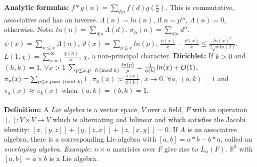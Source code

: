 {\bf Analytic formulas:} $f*g(n)= \sum_{d|n} f(d)g({\frac n d})$.  
This is commutative, associative and has an inverse.
$\Lambda(n)= ln(n)$, if $n= p^m$,
$\Lambda(n)= 0$, otherwise.  Note: $ln(n)= \sum_{d|n} \Lambda(d)$.
$\sigma_{\alpha}(n)= \sum_{d|n} d^{\alpha}$.
$\psi(x)= \sum_{n \leq x} \Lambda(n)$,
$\vartheta(x)= \sum_{p \leq x} ln(p)$.
${\frac {\psi(x)} {x}} -
{\frac {\vartheta(x)} {x}} \leq {\frac {ln(x)^2} {2 {\sqrt x} ln(2)}}$.
$L(1,\chi)= \sum_{n=1}^{\infty} {\frac {\chi(n)} n}$, $\chi$, a
non-principal character.
{\bf Dirichlet:}  If $k>0$ and $(h,k)=1$, $\forall x>1$
$\sum_{p \leq x, p=h \thinspace \textnormal{(mod } k \textnormal{)}} {\frac {ln(p)} p}=
{\frac 1 {\phi(k)}} ln(x) + O(1)$.
$\pi_a (x)= \sum_{p \leq x, p=a \; \thinspace \textnormal{(mod } k \textnormal{)}} 1$.
$\pi_a (x) \approx {\frac {\pi(x)} {\phi(k)}}$, $x \rightarrow 0$,
$\forall a$, $(a, k)=1$ and $\pi_a (x) \approx \pi_b (x)$ when
$(a,k)=(b,k)=1$.
\\
\\
{\bf Definition:} A \emph{Lie algebra} is a vector space, $V$ over a field, $F$ with an operation
$[,]: V \times V \rightarrow V$ which is alternating and bilinear and which satisfies the Jacobi
identity: $[x,[y,z]] + [y,[z,x]] + [z, [x,y]]= 0$.  If $A$ is an associative algebra, there is
a corresponding Lie algebra with $[a,b]= a*b-b*a$, called an \emph{enveloping algebra}.
\emph{Example:} $n \times n$ matricies over $F$ give rise to $L_n(F)$.  ${\mathbb R}^3$ with
$[a, b]= a \times b$ is a Lie algebra.

